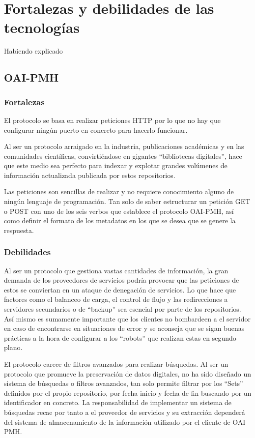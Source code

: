 \section{Fortalezas y debilidades de las tecnologías}

Habiendo explicado 

\subsection{OAI-PMH}

\subsubsection{Fortalezas}

El protocolo se basa en realizar peticiones HTTP por lo que no hay que configurar ningún puerto en concreto para hacerlo funcionar.

Al ser un protocolo arraigado en la industria, publicaciones académicas y en las comunidades científicas, convirtiéndose en gigantes ``bibliotecas digitales'', hace que este medio sea perfecto para indexar y explotar grandes volúmenes de información actualizada publicada por estos repositorios.

Las peticiones son sencillas de realizar y no requiere conocimiento alguno de ningún lenguaje de programación. Tan solo de saber estructurar un petición GET o POST con uno de los seis verbos que establece el protocolo OAI-PMH, así como definir el formato de los metadatos en los que se desea que se genere la respuesta.

\subsubsection{Debilidades}

Al ser un protocolo que gestiona vastas cantidades de información, la gran demanda de los proveedores de servicios podría provocar que las peticiones de estos se conviertan en un ataque de denegación de servicios. Lo que hace que factores como el balanceo de carga, el control de flujo y las redirecciones a servidores secundarios o de ``backup'' sea  esencial por parte de los repositorios. Así mismo es sumamente importante que los clientes no bombardeen a el servidor en caso de encontrarse en situaciones de error y se aconseja que se sigan buenas prácticas a la hora de configurar a los ``robots'' que realizan estas en segundo plano.

El protocolo carece de filtros avanzados para realizar búsquedas. Al ser un protocolo que promueve la preservación de datos digitales, no ha sido diseñado un sistema de búsquedas o filtros avanzados, tan solo permite filtrar por los “Sets” definidos por el propio repositorio, por fecha inicio y fecha de fin buscando por un identificador en concreto. La responsabilidad de implementar un sistema de búsquedas recae por tanto a el proveedor de servicios y su extracción dependerá del sistema de almacenamiento de la información utilizado por el cliente de OAI-PMH.

